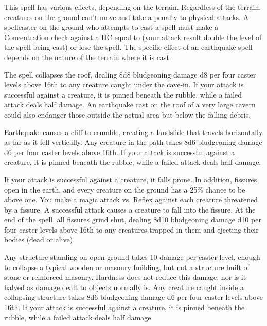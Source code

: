 \spellrng{\rngfar}
\begin{spelleffect}
    This spell has various effects, depending on the terrain. Regardless of the terrain, creatures on the ground can't move and take a  penalty to physical attacks. A spellcaster on the ground who attempts to cast a spell must make a Concentration check against a DC equal to (your attack result \add double the level of the spell being cast) or lose the spell. The specific effect of an earthquake spell depends on the nature of the terrain where it is cast.
  \par {} The spell collapses the roof, dealing 8d8 bludgeoning damage \add d8 per four caster levels above 16th to any creature caught under the cave-in. If your attack is successful against a creature, it is pinned beneath the rubble, while a failed attack deals half damage. An earthquake cast on the roof of a very large cavern could also endanger those outside the actual area but below the falling debris.
  \par {} Earthquake causes a cliff to crumble, creating a landslide that travels horizontally as far as it fell vertically. Any creature in the path takes 8d6 bludgeoning damage \add d6 per four caster levels above 16th. If your attack is successful against a creature, it is pinned beneath the rubble, while a failed attack deals half damage.
  \par {} If your attack is successful against a creature, it falls prone. In addition, fissures open in the earth, and every creature on the ground has a 25\% chance to be above one. You make a magic attack vs. Reflex against each creature threatened by a fissure. A successful attack causes a creature to fall into the fissure. At the end of the spell, all fissures grind shut, dealing 8d10 bludgeoning damage \add d10 per four caster levels above 16th to any creatures trapped in them and ejecting their bodies (dead or alive).
  \par {} Any structure standing on open ground takes 10 damage per caster level, enough to collapse a typical wooden or masonry building, but not a structure built of stone or reinforced masonry. Hardness does not reduce this damage, nor is it halved as damage dealt to objects normally is. Any creature caught inside a collapsing structure takes 8d6 bludgeoning damage \add d6 per four caster levels above 16th. If your attack is successful against a creature, it is pinned beneath the rubble, while a failed attack deals half damage.

\end{spelleffect}

